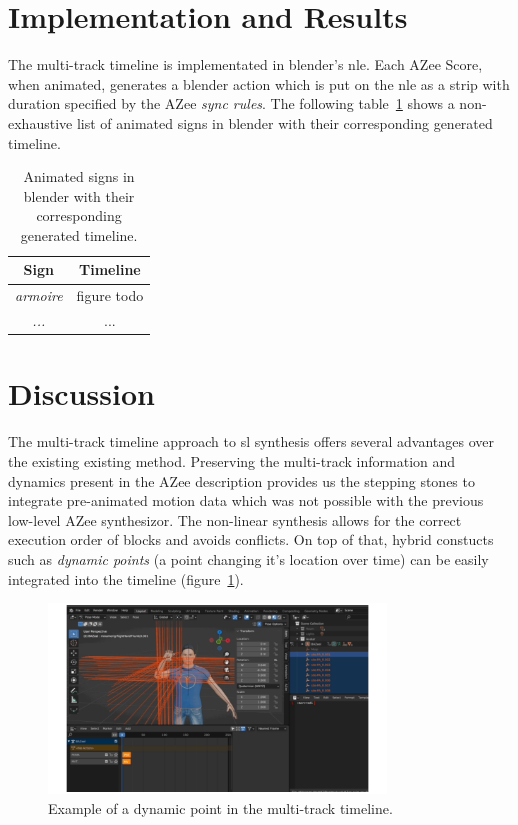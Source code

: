 \documentclass[../../main.tex]{subfiles}
\begin{document}
\section{Implementation and Results}
\label{ch:multi_track:implem_results}

The multi-track timeline is implementated in blender's \gls{nle}. Each AZee Score, when animated, generates a blender action which is put on the \gls{nle} as a strip with duration specified by the AZee \emph{sync rules}. The following table~\ref{tab:azee_to_blender} shows a non-exhaustive list of animated signs in blender with their corresponding generated timeline.

\begin{table}[h]
    \centering
    \begin{tabular}{|c|c|}
        \hline
        \textbf{Sign} & \textbf{Timeline} \\
        \hline
        \emph{armoire} & figure todo \\
        \emph{...} & ... \\
        \hline
    \end{tabular}
    \caption{Animated signs in blender with their corresponding generated timeline.}
    \label{tab:azee_to_blender}
\end{table}

\section{Discussion}
\label{ch:multi_track:discussion}

The multi-track timeline approach to \gls{sl} synthesis offers several advantages over the existing existing method. Preserving the multi-track information and dynamics present in the AZee description provides us the stepping stones to integrate pre-animated motion data which was not possible with the previous low-level AZee synthesizor. The non-linear synthesis allows for the correct execution order of blocks and avoids conflicts. On top of that, hybrid constucts such as \emph{dynamic points} (a point changing it's location over time) can be easily integrated into the timeline (figure~\ref{fig:dynpoint_example}).

\begin{figure}[h]
    \centering
    \includegraphics[width=0.8\textwidth]{chapters/multi_track/images/dynpoint_example.png}
    \caption{Example of a dynamic point in the multi-track timeline.}
    \label{fig:dynpoint_example}
\end{figure}
\end{document}

